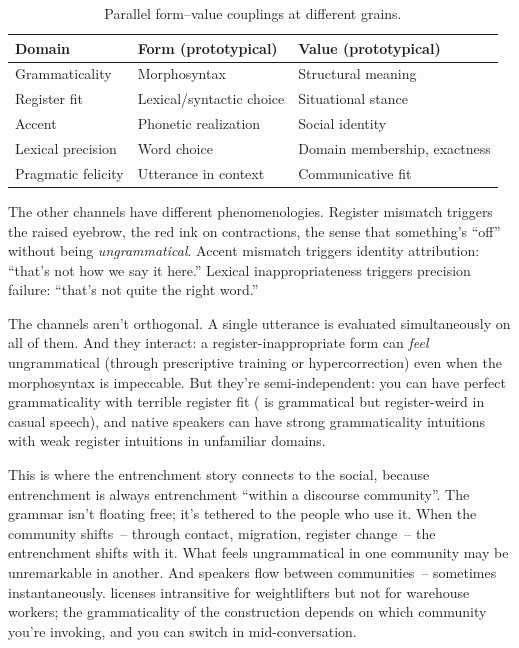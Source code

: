 \begin{table}[h]
\centering
\small
\begin{tabular}{@{}lll@{}}
\toprule
\textbf{Domain} & \textbf{Form (prototypical)} & \textbf{Value (prototypical)} \\
\midrule
Grammaticality & Morphosyntax & Structural meaning \\
Register fit & Lexical/syntactic choice & Situational stance \\
Accent & Phonetic realization & Social identity \\
Lexical precision & Word choice & Domain membership, exactness \\
Pragmatic felicity & Utterance in context & Communicative fit \\
\bottomrule
\end{tabular}
\caption{Parallel form--value couplings at different grains.}
\label{tab:appropriateness-channels}
\end{table}

The other channels have different phenomenologies. Register mismatch triggers the raised eyebrow, the red ink on contractions, the sense that something's \enquote{off} without being \emph{ungrammatical}. Accent mismatch triggers identity attribution: \enquote{that's not how we say it here.} Lexical inappropriateness triggers precision failure: \enquote{that's not quite the right word.}

The channels aren't orthogonal. A single utterance is evaluated simultaneously on all of them. And they interact: a register-inappropriate form can \emph{feel} ungrammatical (through prescriptive training or hypercorrection) even when the morphosyntax is impeccable. But they're semi-independent: you can have perfect grammaticality with terrible register fit ( is grammatical but register-weird in casual speech), and native speakers can have strong grammaticality intuitions with weak register intuitions in unfamiliar domains.

This is where the entrenchment story connects to the social, because entrenchment is always entrenchment \enquote{within a discourse community}. The grammar isn't floating free; it's tethered to the people who use it. When the community shifts~-- through contact, migration, register change~-- the entrenchment shifts with it. What feels ungrammatical in one community may be unremarkable in another. And speakers flow between communities~-- sometimes instantaneously.  licenses intransitive  for weightlifters but not for warehouse workers; the grammaticality of the construction depends on which community you're invoking, and you can switch in mid-conversation.

